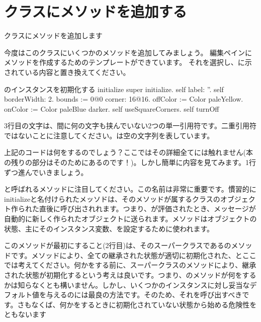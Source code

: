 \documentclass[a4paper,10pt,twoside]{book}
\begin{document}
\section{クラスにメソッドを追加する}

クラスにメソッドを追加します

今度はこのクラスにいくつかのメソッドを追加してみましょう。
編集ペインにメソッドを作成するためのテンプレートができています。
それを選択し、に示されている内容と置き換えてください。

\begin{numMethod}[scbecellinitialize]{のインスタンスを初期化する}
initialize
   super initialize.
   self label: ''.
   self borderWidth: 2.
   bounds := 0@0 corner: 16@16.
   offColor := Color paleYellow.
   onColor := Color paleBlue darker.
   self useSquareCorners.
   self turnOff
\end{numMethod}

\noindent
3行目の文字は、間に何の文字も挟んでいない2つの単一引用符です。二重引用符ではないことに注意してください。は空の文字列を表しています。


上記のコードは何をするのでしょう？ここではその詳細全てには触れません(本の残りの部分はそのためにあるのです！)。しかし簡単に内容を見てみます。1行ずつ進んでいきましょう。

と呼ばれるメソッドに注目してください。この名前は非常に重要です。慣習的にinitializeと名付けられたメッソドは、そのメソッドが属するクラスのオブジェクト作られた直後に呼び出されれます。つまり、が評価されたとき、メッセージが自動的に新しく作られたオブジェクトに送られます。メソッドはオブジェクトの状態、主にそのインスタンス変数、を設定するために使われます。

このメソッドが最初にすること(2行目)は、そのスーパークラスであるのメソッドです。メソッドにより、全ての継承された状態が適切に初期化された、とここでは考えてください。何かをする前に、スーパークラスのメソッドにより、継承された状態が初期化するという考えは良いです。つまり、のメソッドが何をするかは知らなくとも構いません。しかし、いくつかのインスタンスに対し妥当なデフォルト値を与えるのには最良の方法です。そのため、それを呼び出すべきです。さもなくば、何かをするときに初期化されていない状態から始める危険性をともないます
\end{document}
